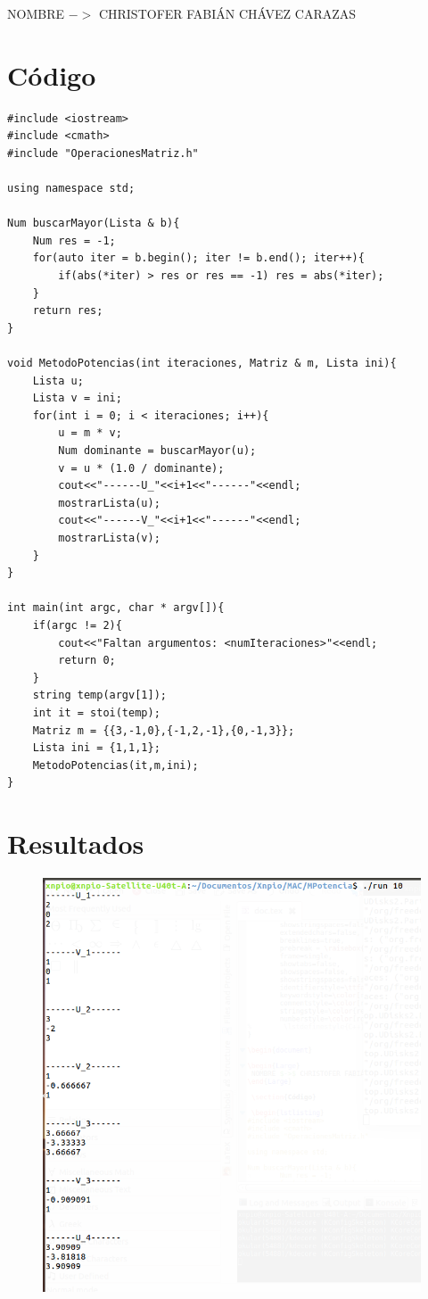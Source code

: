 \documentclass[a4paper,12pt]{article}
\begin{document}
\begin{Large}
 NOMBRE $->$ CHRISTOFER FABIÁN CHÁVEZ CARAZAS
\end{Large}

 \section{Código}
 
 \begin{lstlisting}
#include <iostream>
#include <cmath>
#include "OperacionesMatriz.h"

using namespace std;

Num buscarMayor(Lista & b){
	Num res = -1;
	for(auto iter = b.begin(); iter != b.end(); iter++){
		if(abs(*iter) > res or res == -1) res = abs(*iter);
	}
	return res;
}

void MetodoPotencias(int iteraciones, Matriz & m, Lista ini){
	Lista u;
	Lista v = ini;
	for(int i = 0; i < iteraciones; i++){
		u = m * v;
		Num dominante = buscarMayor(u);
		v = u * (1.0 / dominante);
		cout<<"------U_"<<i+1<<"------"<<endl;
		mostrarLista(u);
		cout<<"------V_"<<i+1<<"------"<<endl;
		mostrarLista(v);
	}
}

int main(int argc, char * argv[]){
	if(argc != 2){
		cout<<"Faltan argumentos: <numIteraciones>"<<endl;
		return 0;
	}
	string temp(argv[1]);
	int it = stoi(temp);
	Matriz m = {{3,-1,0},{-1,2,-1},{0,-1,3}};
	Lista ini = {1,1,1};
	MetodoPotencias(it,m,ini);
}
 \end{lstlisting}

\section{Resultados}

\begin{figure}[h]
  \centering
  \includegraphics[scale = 0.25]{1.png}
\end{figure}
\end{document}
